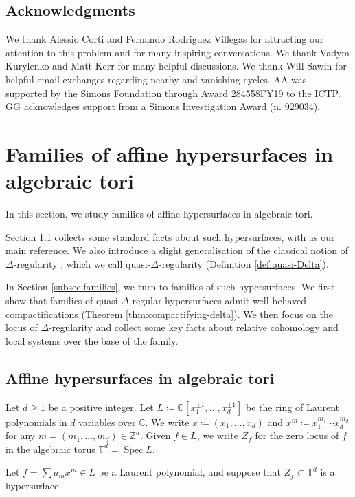 \documentclass[11pt, reqno]{amsart}
\theoremstyle{plain}
\theoremstyle{definition}
\newcommand{\CC}{\mathbb{C}}
\newcommand{\ZZ}{\mathbb{Z}}
\newcommand{\TT}{\mathbb{T}}
\DeclareMathOperator{\Spec}{Spec}
\begin{document}
\subsection*{Acknowledgments}
We thank Alessio Corti and Fernando Rodriguez Villegas for attracting our attention to this problem and for many inspiring conversations.
We thank Vadym Kurylenko and Matt Kerr for many helpful discussions. 
We thank Will Sawin for helpful email exchanges regarding nearby and vanishing cycles. 
AA was supported by the Simons Foundation through Award 284558FY19 to the ICTP.
GG acknowledges support from a Simons Investigation Award (n. 929034).



\section{Families of affine hypersurfaces in algebraic tori}
\label{sec:families}
In this section, we study families of affine hypersurfaces in algebraic tori.  

Section \ref{sec:hypersurfaces} collects some standard facts about such hypersurfaces, with \cite{Batyrev-tori} as our main reference. We also introduce a slight generalisation of the classical notion of $\Delta$-regularity \cite[Definition 3.3]{Batyrev-tori}, which we call quasi-$\Delta$-regularity (Definition \ref{def:quasi-Delta}).

In Section \ref{subsec:families}, we turn to families of such hypersurfaces. We first show that families of quasi-$\Delta$-regular hypersurfaces admit well-behaved compactifications (Theorem \ref{thm:compactifying-delta}).
We then focus on the locus of $\Delta$-regularity and collect some key facts about relative cohomology and local systems over the base of the family.


\subsection{Affine hypersurfaces in algebraic tori}
\label{sec:hypersurfaces}
Let $d \geq 1$ be a positive integer. 
Let $L\coloneqq \CC[x_1^{\pm 1},\dots,x_d^{\pm 1}]$ be the ring of Laurent polynomials in $d$ variables over $\CC$. 
We write $x\coloneqq (x_1, \dots, x_d)$ and $x^m \coloneqq x_1^{m_1} \cdots x_d^{m_d}$ for any  $m=(m_1, \dots, m_d) \in \ZZ^d$. Given $f \in L$, we write $Z_f$ for the zero locus of $f$ in the algebraic torus $\TT^d=\Spec L$. 

Let $f = \sum a_m x^{m} \in L$ be a Laurent polynomial, and suppose that $Z_f \subset \TT^{d}$ is a hypersurface.
\end{document}
